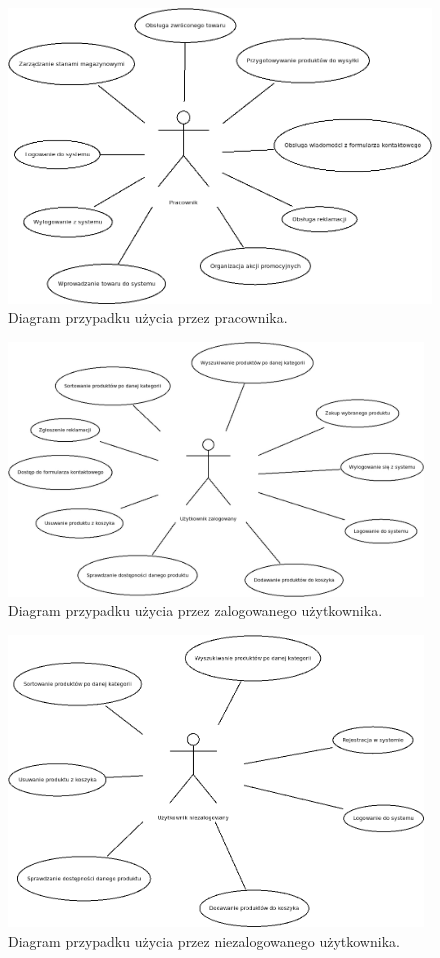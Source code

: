 \documentclass[a4paper,11pt]{article}
\begin{document}
\begin{figure}[h]
\centering
\includegraphics[width=12cm]{Diagramy/PrzypadkiUzycia/Pracownik.jpeg}
\caption{Diagram przypadku użycia przez pracownika.}

\end{figure}

\begin{figure}[h]
\centering
\includegraphics[width=11cm]{Diagramy/PrzypadkiUzycia/Zalogowany.jpeg}
\caption{Diagram przypadku użycia przez zalogowanego użytkownika.}
\end{figure}

\begin{figure}[h]
\centering
\includegraphics[width=11cm]{Diagramy/PrzypadkiUzycia/Niezalogowany.jpeg}
\caption{Diagram przypadku użycia przez niezalogowanego użytkownika.}
\end{figure}
\end{document}

